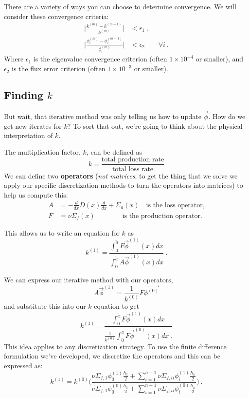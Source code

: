 \documentclass[12pt]{article}
\newcommand{\ve}[1]{\ensuremath{\mathbf{#1}}}
\begin{document}
There are a variety of ways you can choose to determine convergence. We will consider these convergence criteria:
\begin{align}
\bigg|\frac{k^{(m)} - k^{(m-1)}}{k^{(m)}}\bigg| &< \epsilon_1 \:, \nonumber \\
\bigg|\frac{\phi_i^{(m)} - \phi_i^{(m-1)}}{\phi_i^{(m)}}\bigg| &< \epsilon_2 \qquad \forall i\:. \nonumber
\end{align}
%
Where $\epsilon_1$ is the eigenvalue convergence criterion (often $1 \times 10^{-4}$ or smaller), and $\epsilon_2$ is the flux error criterion (often $1 \times 10^{-3}$ or smaller).

\subsection*{Finding $k$}

But wait, that iterative method was only telling us how to update $\vec{\phi}$. How do we get new iterates for $k$? To sort that out, we're going to think about the physical interpretation of $k$.

The multiplication factor, $k$, can be defined as
\[k = \frac{\text{total production rate}}{\text{total loss rate}}\]
%
We can define two \textbf{operators} (\emph{not matrices}; to get the thing that we solve we apply our specific discretization methods to turn the operators into matrices) to help us compute this:
%
\begin{align}
A &= -\frac{d}{dx}D(x)\frac{d}{dx} + \Sigma_a(x) \quad \text{is the loss operator,} \nonumber \\
F &= \nu\Sigma_f(x) \qquad \qquad \text{is the production operator.}\nonumber
\end{align}

This allows us to write an equation for $k$ as
\[k^{(1)} = \frac{\int_0^{\tilde{a}} F \vec{\phi}^{(1)}(x)dx}{\int_0^{\tilde{a}} A \vec{\phi}^{(1)}(x)dx}\:. \]

We can express our iterative method with our operators,
\[ A \vec{\phi}^{(1)} = \frac{1}{k^{(0)}}F\vec{\phi^{(0)}}\]
%
and substitute this into our $k$ equation to get
\[k^{(1)} = \frac{\int_0^{\tilde{a}} F \vec{\phi}^{(1)}(x)dx}{\frac{1}{k^{(0)}}\int_0^{\tilde{a}} F \vec{\phi}^{(0)}(x)dx\:.} \]
%
This idea applies to any discretization strategy. To use the finite difference formulation we've developed, we discretize the operators and this can be expressed as:
\[k^{(1)} = k^{(0)}\Biggl(\frac{\nu\Sigma_{f,1} \phi_0^{(1)} \frac{h_1}{2} + \sum_{i=1}^{n-1} \nu\Sigma_{f,ii} \phi_i^{(1)} \frac{h_{ii}}{2}}
{\nu\Sigma_{f,1} \phi_0^{(0)} \frac{h_1}{2} + \sum_{i=1}^{n-1} \nu\Sigma_{f,ii} \phi_i^{(0)} \frac{h_{ii}}{2}}\Biggr)\:.\]
\end{document}

